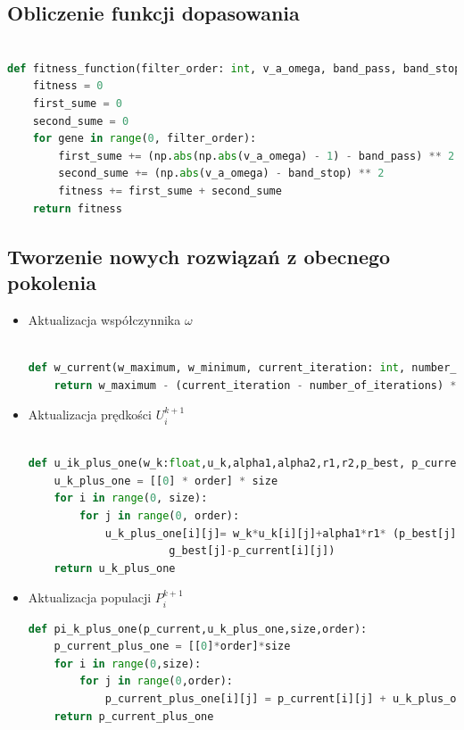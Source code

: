 \documentclass[eng, pl, oneside, openright, final, openbib]{mgr}\DeclareUnicodeCharacter{0301}{\'{e}}
\begin{document}
\subsection{Obliczenie funkcji dopasowania}
\begin{lstlisting}[language=Python, caption=Implementacja funkcji klasyfikującej rozwiązanie]

def fitness_function(filter_order: int, v_a_omega, band_pass, band_stop):
    fitness = 0
    first_sume = 0
    second_sume = 0
    for gene in range(0, filter_order):
        first_sume += (np.abs(np.abs(v_a_omega) - 1) - band_pass) ** 2
        second_sume += (np.abs(v_a_omega) - band_stop) ** 2
        fitness += first_sume + second_sume
    return fitness
\end{lstlisting}
\subsection{Tworzenie nowych rozwiązań z obecnego pokolenia}
\begin{itemize}
\item Aktualizacja współczynnika $\omega$
\begin{lstlisting}[language=Python, caption=Implementacja aktualizacji współczynnika $\omega$]

def w_current(w_maximum, w_minimum, current_iteration: int, number_of_iterations: int):
    return w_maximum - (current_iteration - number_of_iterations) * (w_maximum - w_minimum)
\end{lstlisting}
\item Aktualizacja prędkości $U^{k + 1}_{i}$
\begin{lstlisting}[language=Python, caption=Implementacja aktualizacji współczynnika prędkości $U^{k + 1}_{i}$]

def u_ik_plus_one(w_k:float,u_k,alpha1,alpha2,r1,r2,p_best, p_current, g_best,size:int,order:int):
    u_k_plus_one = [[0] * order] * size
    for i in range(0, size):
        for j in range(0, order):
            u_k_plus_one[i][j]= w_k*u_k[i][j]+alpha1*r1* (p_best[j]-p_current[i][j])+alpha2*r2*(
                      g_best[j]-p_current[i][j])
    return u_k_plus_one
\end{lstlisting}
\item Aktualizacja populacji $P^{k + 1}_{i}$
\begin{lstlisting}[language=Python, caption=Implementacja aktualizacji współczynnika prędkości $P^{k + 1}_{i}$]
def pi_k_plus_one(p_current,u_k_plus_one,size,order):
    p_current_plus_one = [[0]*order]*size
    for i in range(0,size):
        for j in range(0,order):
            p_current_plus_one[i][j] = p_current[i][j] + u_k_plus_one[i][j]
    return p_current_plus_one
\end{lstlisting}

\end{itemize}
\end{document}
